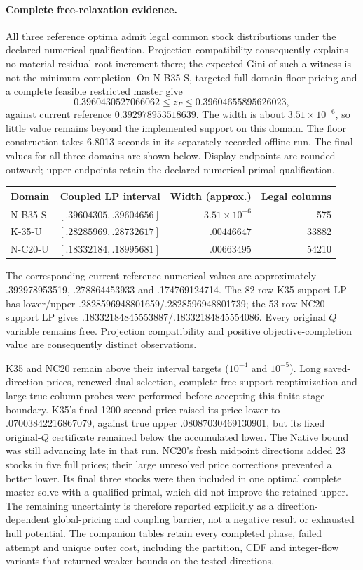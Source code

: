 \paragraph{Complete free-relaxation evidence.}
All three reference optima admit legal common stock distributions under the
declared numerical qualification. Projection compatibility consequently
explains no material residual root increment there; the expected Gini of
such a witness is not the minimum completion. On N-B35-S, targeted full-domain
floor pricing and a complete feasible restricted master give
\[
 0.3960430527066062\le z_\Gamma\le0.39604655895626023,
\]
against current reference $0.392978953518639$. The width is about
$3.51\times10^{-6}$, so little value remains beyond the implemented support
on this domain. The floor construction takes 6.8013 seconds in its separately
recorded offline run. The final values for all three domains are shown
below. Display endpoints are rounded outward; upper endpoints retain the
declared numerical primal qualification.
\begin{center}
\begin{tabular}{lrrr}
\toprule
Domain & Coupled LP interval & Width (approx.) & Legal columns\\
\midrule
N-B35-S & $[.39604305,.39604656]$ & $3.51\times10^{-6}$ & 575\\
K-35-U & $[.28285969,.28732617]$ & $.00446647$ & 33882\\
N-C20-U & $[.18332184,.18995681]$ & $.00663495$ & 54210\\
\bottomrule
\end{tabular}
\end{center}
The corresponding current-reference numerical values are approximately
.392978953519, .278864453933 and .174769124714. The 82-row K35 support LP
has lower/upper .2828596948801659/.2828596948801739; the 53-row NC20 support
LP gives .18332184845553887/.18332184845554086. Every original $Q$ variable
remains free. Projection compatibility and positive objective-completion
value are consequently distinct observations.

K35 and NC20 remain above their interval targets ($10^{-4}$ and $10^{-5}$).
Long saved-direction prices, renewed dual selection, complete free-support
reoptimization and large true-column probes were performed before accepting
this finite-stage boundary. K35's final 1200-second price raised its price
lower to .07003842216867079, against true upper .08087030469130901, but its
fixed original-$Q$ certificate remained below the accumulated lower. The
Native bound was still advancing late in that run. NC20's fresh midpoint
directions added 23 stocks in five full prices; their large unresolved
price corrections prevented a better lower. Its final three stocks were
then included in one optimal complete master solve with a qualified primal,
which did not improve the retained upper. The remaining uncertainty is
therefore reported explicitly as a direction-dependent global-pricing and
coupling barrier, not a negative result or exhausted hull potential.
The companion tables retain every completed phase, failed attempt and
unique outer cost, including the partition, CDF and integer-flow variants
that returned weaker bounds on the tested directions.

